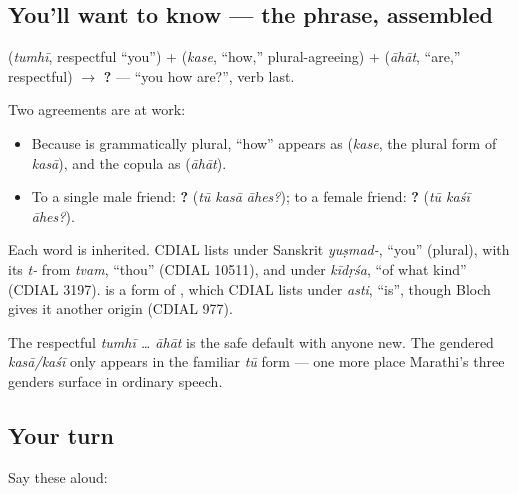 \subsection*{You'll want to know — the phrase, assembled}
\textbf{} (\emph{tumhī}, respectful \textquotedblleft{}you\textquotedblright{}) + \textbf{} (\emph{kase}, \textquotedblleft{}how,\textquotedblright{} plural-agreeing) + \textbf{} (\emph{āhāt}, \textquotedblleft{}are,\textquotedblright{} respectful) $\to$ \textbf{  ?} — \textquotedblleft{}you how are?\textquotedblright{}, verb last.

Two agreements are at work:

\begin{itemize}
\raggedright
  \item Because \textbf{} is grammatically plural, \textquotedblleft{}how\textquotedblright{} appears as \textbf{} (\emph{kase}, the plural form of \emph{kasā}), and the copula as \textbf{} (\emph{āhāt}).
  \item To a single male friend: \textbf{  ?} (\emph{tū kasā āhes?}); to a female friend: \textbf{  ?} (\emph{tū kaśī āhes?}).
\end{itemize}

\begin{cousinweb}
Each word is inherited. CDIAL lists \textbf{} under Sanskrit \emph{yuṣmad-}, \textquotedblleft{}you\textquotedblright{} (plural), with its \emph{t-} from \emph{tvam}, \textquotedblleft{}thou\textquotedblright{} (CDIAL 10511), and \textbf{} under \emph{kīdṛśa}, \textquotedblleft{}of what kind\textquotedblright{} (CDIAL 3197). \textbf{} is a form of \textbf{}, which CDIAL lists under \emph{asti}, \textquotedblleft{}is\textquotedblright{}, though Bloch gives it another origin (CDIAL 977).
\end{cousinweb}

\begin{culture}
The respectful \emph{tumhī … āhāt} is the safe default with anyone new. The gendered \emph{kasā/kaśī} only appears in the familiar \emph{tū} form — one more place Marathi's three genders surface in ordinary speech.
\end{culture}

\subsection*{Your turn}
Say these aloud:

